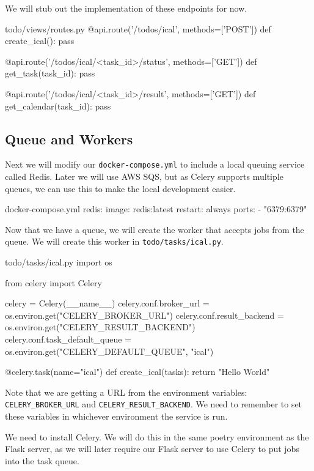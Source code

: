 \documentclass{csse4400}
\begin{document}
\noindent
We will stub out the implementation of these endpoints for now.
\begin{code}[language=python,numbers=none]{todo/views/routes.py}
@api.route('/todos/ical', methods=['POST'])
def create_ical():
    pass

@api.route('/todos/ical/<task_id>/status', methods=['GET'])
def get_task(task_id):
    pass

@api.route('/todos/ical/<task_id>/result', methods=['GET'])
def get_calendar(task_id):
    pass
\end{code}

\subsection{Queue and Workers}

Next we will modify our \texttt{docker-compose.yml} to include a local queuing service called Redis.
Later we will use AWS SQS, but as Celery supports multiple queues,
we can use this to make the local development easier.
%
\begin{code}[numbers=none]{docker-compose.yml}
  redis:
    image: redis:latest
    restart: always
    ports:
      - "6379:6379"
\end{code}

\noindent
Now that we have a queue,
we will create the worker that accepts jobs from the queue.
We will create this worker in \texttt{todo/tasks/ical.py}.
%
\begin{code}[language=python,numbers=none]{todo/tasks/ical.py}
import os

from celery import Celery

celery = Celery(__name__)
celery.conf.broker_url = os.environ.get("CELERY_BROKER_URL")
celery.conf.result_backend = os.environ.get("CELERY_RESULT_BACKEND")
celery.conf.task_default_queue = os.environ.get("CELERY_DEFAULT_QUEUE", "ical")

@celery.task(name="ical")
def create_ical(tasks):
    return "Hello World"
\end{code}

\noindent
Note that we are getting a URL from the environment variables:
\texttt{CELERY\_BROKER\_URL} and \texttt{CELERY\_RESULT\_BACKEND}.
We need to remember to set these variables in whichever environment the service is run.

We need to install Celery.
We will do this in the same poetry environment as the Flask server,
as we will later require our Flask server to use Celery to put jobs into the task queue.
\end{document}
